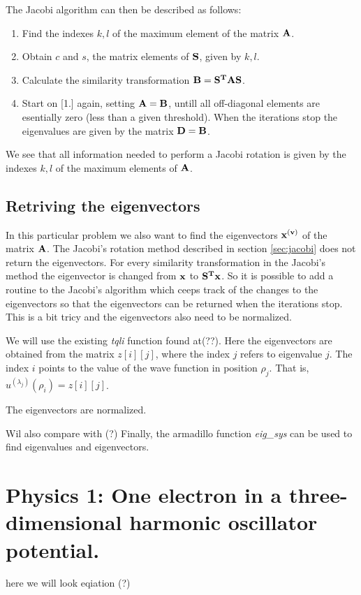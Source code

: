 \documentclass[11pt,a4wide]{article}
\begin{document}
The Jacobi algorithm can then be described as follows: 
\begin{enumerate}
\item Find the indexes $k, l$ of the maximum element of the matrix $\bf A$.
\item Obtain $c$ and $s$, the matrix elements of $\bf S$, given by $k, l$.
\item Calculate the similarity transformation $\bf{B = S^TAS}$.
\item Start on [1.] again, setting $\bf {A = B}$, untill all off-diagonal elements are esentially zero (less than a given threshold). When the iterations stop the eigenvalues are given by the matrix $\bf {D = B}$.
\end{enumerate}

We see that all information needed to perform a Jacobi rotation is given by the indexes $k, l$ of the maximum elements of $\bf A$.

\subsection{Retriving the eigenvectors}
In this particular problem we also want to find the eigenvectors $\bf x^{(v)}$ of the matrix $\bf A$. The Jacobi's rotation method described in section \ref{sec:jacobi} does not return the eigenvectors. For every similarity transformation in the Jacobi's method the eigenvector is changed from $\bf x$ to $\bf{S^Tx}$. So it is possible to add a routine to the Jacobi's algorithm which ceeps track of the changes to the eigenvectors so that the eigenvectors can be returned when the iterations stop. This is a bit tricy and the eigenvectors also need to be normalized.

We will use the existing {\em tqli} function found at(??). Here the eigenvectors are obtained from the matrix $z[i][j]$, where the index $j$ refers to eigenvalue $j$. The index $i$ points to the value of the wave function in position $\rho_j$. That is,  $u^{(\lambda_j)}(\rho_i)=z[i][j]$.   

The eigenvectors are normalized. 

Wil also compare with (?)
Finally, the armadillo function {\em eig\_sys} can be used to find eigenvalues and eigenvectors.


\section{Physics 1: One electron in a three-dimensional harmonic oscillator potential.}
here we will look eqiation (?)
\end{document}
